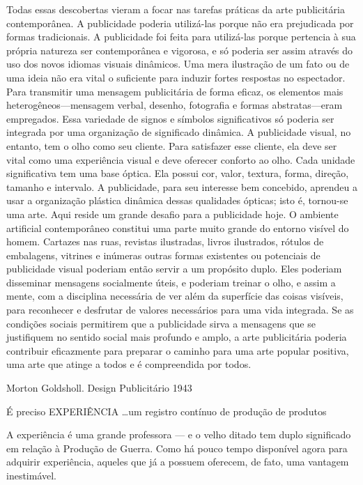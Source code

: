 \documentclass[a4paper]{article}
\begin{document}
Todas essas descobertas vieram a focar nas tarefas práticas da arte publicitária contemporânea. A publicidade poderia utilizá-las porque não era prejudicada por formas tradicionais. A publicidade foi feita para utilizá-las porque pertencia à sua própria natureza ser contemporânea e vigorosa, e só poderia ser assim através do uso dos novos idiomas visuais dinâmicos. Uma mera ilustração de um fato ou de uma ideia não era vital o suficiente para induzir fortes respostas no espectador. Para transmitir uma mensagem publicitária de forma eficaz, os elementos mais heterogêneos---mensagem verbal, desenho, fotografia e formas abstratas---eram empregados. Essa variedade de signos e símbolos significativos só poderia ser integrada por uma organização de significado dinâmica. A publicidade visual, no entanto, tem o olho como seu cliente. Para satisfazer esse cliente, ela deve ser vital como uma experiência visual e deve oferecer conforto ao olho. Cada unidade significativa tem uma base óptica. Ela possui cor, valor, textura, forma, direção, tamanho e intervalo. A publicidade, para seu interesse bem concebido, aprendeu a usar a organização plástica dinâmica dessas qualidades ópticas; isto é, tornou-se uma arte. Aqui reside um grande desafio para a publicidade hoje. O ambiente artificial contemporâneo constitui uma parte muito grande do entorno visível do homem. Cartazes nas ruas, revistas ilustradas, livros ilustrados, rótulos de embalagens, vitrines e inúmeras outras formas existentes ou potenciais de publicidade visual poderiam então servir a um propósito duplo. Eles poderiam disseminar mensagens socialmente úteis, e poderiam treinar o olho, e assim a mente, com a disciplina necessária de ver além da superfície das coisas visíveis, para reconhecer e desfrutar de valores necessários para uma vida integrada. Se as condições sociais permitirem que a publicidade sirva a mensagens que se justifiquem no sentido social mais profundo e amplo, a arte publicitária poderia contribuir eficazmente para preparar o caminho para uma arte popular positiva, uma arte que atinge a todos e é compreendida por todos.

Morton Goldsholl. Design Publicitário 1943

É preciso EXPERIÊNCIA
\ldots um registro
contínuo
de
produção de produtos

A experiência é uma grande professora --- e o velho ditado tem duplo significado em relação à Produção de Guerra. Como há pouco tempo disponível agora para adquirir experiência, aqueles que já a possuem oferecem, de fato, uma vantagem inestimável.
\end{document}
